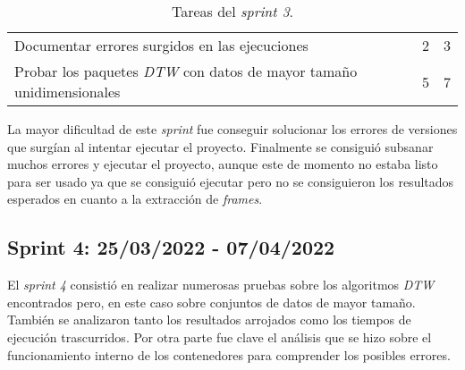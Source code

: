 \begin{table}[H]
{\begin{tabular}{p{10cm}cc}
\rowcolor[HTML]{ECF4FF} 
Documentar errores surgidos en las ejecuciones                     & 2                                                         & 3                                                          \\
\rowcolor[HTML]{EFEFEF} 
Probar los paquetes \textit{DTW} con datos de mayor tamaño unidimensionales & 5                                                         & 7                                                          \\ \hline
\end{tabular}
}
\caption{Tareas del \textit{sprint 3}.}
\label{sprint3}
\end{table}

La mayor dificultad de este \textit{sprint} fue conseguir solucionar los errores de versiones que surgían al intentar ejecutar el proyecto. Finalmente se consiguió subsanar muchos errores y ejecutar el proyecto, aunque este de momento no estaba listo para ser usado ya que se consiguió ejecutar pero no se consiguieron los resultados esperados en cuanto a la extracción de \textit{frames}.

\subsection{Sprint 4: 25/03/2022 - 07/04/2022}

El \textit{sprint 4} consistió en realizar numerosas pruebas sobre los algoritmos \textit{DTW} encontrados pero, en este caso sobre conjuntos de datos de mayor tamaño. También se analizaron tanto los resultados arrojados como los tiempos de ejecución trascurridos. 
Por otra parte fue clave el análisis que se hizo sobre el funcionamiento interno de los contenedores para comprender los posibles errores. 

